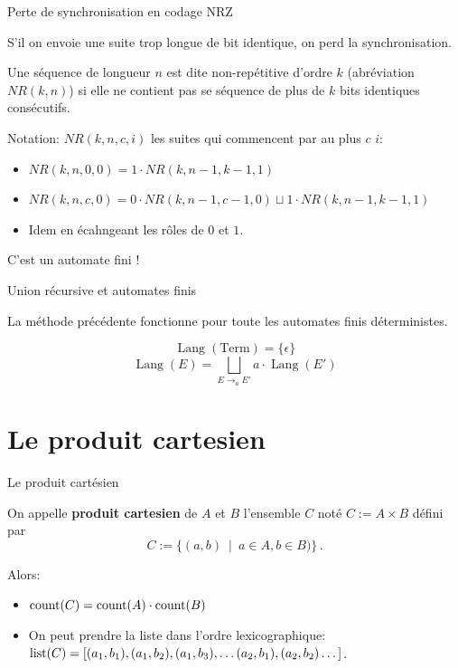 \documentclass{beamer}
\begin{document}
\begin{frame}{Perte de synchronisation en codage NRZ}

  S'il on envoie une suite trop longue de bit identique, on perd la
  synchronisation.
  \medskip

  \begin{definition}
    Une séquence de longueur $n$ est dite non-repétitive d'ordre $k$
    (abréviation $NR(k, n)$) si elle ne contient pas se séquence de plus de
    $k$ bits identiques consécutifs.
  \end{definition}
  Notation: $NR(k, n, c, i)$ les suites qui commencent par au plus $c$ $i$:
  \begin{itemize}
  \item $NR(k, n, 0, 0) = 1 \cdot NR(k, n-1, k-1, 1)$
  \item $NR(k, n, c, 0) = 0 \cdot NR(k, n-1, c-1, 0) \sqcup 
               1 \cdot NR(k, n-1, k-1, 1)$
             \item Idem en écahngeant les rôles de $0$ et $1$.
  \end{itemize}
  \pause
  \LARGE C'est un automate fini !
\end{frame}

\begin{frame}{Union récursive et automates finis}

  \begin{NOTE}
    La méthode précédente fonctionne pour toute les automates finis
    déterministes.
  \end{NOTE}
  \[
  \operatorname{Lang}(\text{Term}) = \{\epsilon\}
  \]
  \[
  \operatorname{Lang}(E) = \bigsqcup_{E\rightarrow_a E'} a\cdot \operatorname{Lang}(E')
  \]
\end{frame}

\section{Le produit cartesien}
\begin{frame}{Le produit cartésien}

  \begin{definition}
    On appelle \textbf{produit cartesien} de $A$ et $B$ l'ensemble $C$ noté 
    $C:=A\times B$ défini par
    $$C := \{(a,b)\ \mid\ a\in A, b\in B)\}\,.$$
  \end{definition}
  \pause\bigskip

  Alors:
  \begin{itemize}
  \item $\operatorname{count}(C) = \operatorname{count}(A)\cdot\operatorname{count}(B)$
  \item On peut prendre la liste dans l'ordre lexicographique:
    $\operatorname{list}(C) = 
    [(a_1, b_1), (a_1, b_2), (a_1, b_3),\dots  (a_2, b_1), (a_2, b_2)\dots]$.
  \end{itemize}
\end{frame}
\end{document}
